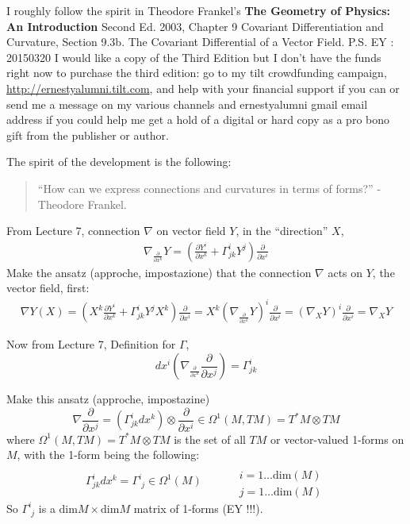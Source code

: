 \documentclass[10pt]{amsart}
\begin{document}
\begin{multicols*}{2}
	I roughly follow the spirit in Theodore Frankel's \textbf{The Geometry of Physics: An Introduction} Second Ed. 2003, Chapter 9 Covariant Differentiation and Curvature, Section 9.3b. The Covariant Differential of a Vector Field. P.S. EY : 20150320 I would like a copy of the Third Edition but I don't have the funds right now to purchase the third edition: go to my tilt crowdfunding campaign, \url{http://ernestyalumni.tilt.com}, and help with your financial support if you can or send me a message on my various channels and ernestyalumni gmail email address if you could help me get a hold of a digital or hard copy as a pro bono gift from the publisher or author.  
	
	The spirit of the development is the following:
	\begin{quote}
		``How can we express connections and curvatures in terms of forms?'' -Theodore Frankel.  
	\end{quote}
	
	From Lecture 7, connection $\nabla$ on vector field $Y$, in the ``direction'' $X$,
	\[
	\begin{gathered}
	\nabla_{ \frac{ \partial }{ \partial x^k } } Y = \left( \frac{ \partial Y^i }{ \partial x^k } + \Gamma^i_{jk} Y^j  \right) \frac{ \partial }{ \partial x^i }
	\end{gathered}
	\]
	Make the ansatz (approche, impostazione) that the connection $\nabla$ acts on $Y$, the vector field, first:
	\[
	\begin{gathered}
	\nabla Y(X) = \left( X^k \frac{ \partial Y^i}{ \partial x^k} + \Gamma^i_{jk} Y^j X^k \right) \frac{ \partial}{ \partial x^i } = X^k \left( \nabla_{ \frac{ \partial }{ \partial x^k} } Y \right)^i \frac{ \partial }{ \partial x^i} = (\nabla_X Y)^i \frac{ \partial}{ \partial x^i} = \nabla_XY
	\end{gathered}
	\]
	
	Now from Lecture 7, Definition for $\Gamma$, 
	\[
	dx^i \left( \nabla_{ \frac{  \partial }{ \partial x^k } } \frac{ \partial }{ \partial x^j } \right) = \Gamma^i_{jk}
	\]
	
	Make this ansatz (approche, impostazine)
	\[
	\nabla \frac{ \partial}{ \partial x^j } = \left( \Gamma^i_{jk} dx^k \right) \otimes \frac{ \partial }{ \partial x^i} \in \Omega^1(M,TM) = T^*M \otimes TM
	\]
	where $\Omega^1(M,TM) = T^*M \otimes TM$ is the set of all $TM$ or vector-valued 1-forms on $M$, with the 1-form being the following:
	\[
	\Gamma^i_{jk} dx^k = \Gamma^i_{ \, \, j } \in \Omega^1(M) \quad \quad \, \begin{aligned}
	& \quad \\
	& i = 1 \dots \text{dim}(M) \\ 
	& j = 1\dots \text{dim}(M) \end{aligned}
	\]
	So $\Gamma^i_{ \, \, j}$ is a $\text{dim}M \times \text{dim}M$ matrix of 1-forms (EY !!!). 
	

\end{multicols*}
\end{document}
